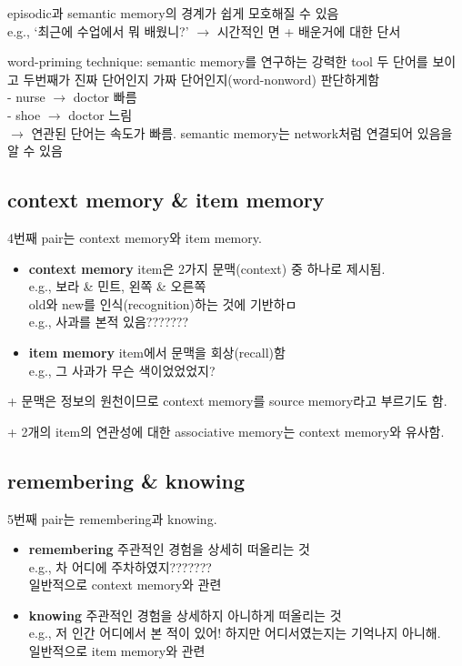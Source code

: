 \documentclass[../note.tex]{subfiles}
\begin{document}
\begin{note}
\begin{itemize}
      episodic과 semantic memory의 경계가 쉽게 모호해질 수 있음\\
      e.g., `최근에 수업에서 뭐 배웠니?' $\rightarrow$ 시간적인 면 + 배운거에 대한 단서

      word-priming technique: semantic memory를 연구하는 강력한 tool
        두 단어를 보이고 두번째가 진짜 단어인지 가짜 단어인지(word-nonword) 판단하게함\\
        - nurse $\rightarrow$ doctor 빠름\\
        - shoe $\rightarrow$ doctor 느림\\
        $\rightarrow$ 연관된 단어는 속도가 빠름. semantic memory는 network처럼 연결되어 있음을 알 수 있음
  \end{itemize}
\end{note}

\subsection{context memory \& item memory}
\label{subsec:contextmemoryitemmemory}
4번째 pair는 context memory와 item memory.

\begin{itemize}
  \item{\textbf{context memory}}
    item은 2가지 문맥(context) 중 하나로 제시됨.\\
    e.g., 보라 \& 민트, 왼쪽 \& 오른쪽\\
    old와 new를 인식(recognition)하는 것에 기반하ㅁ\\
    e.g., 사과를 본적 있음???????
  \item{\textbf{item memory}}
    item에서 문맥을 회상(recall)함\\
    e.g., 그 사과가 무슨 색이었었었지?
\end{itemize}

+ 문맥은 정보의 원천이므로 context memory를 source memory라고 부르기도 함.

+ 2개의 item의 연관성에 대한 associative memory는 context memory와 유사함.

\subsection{remembering \& knowing}
5번째 pair는 remembering과 knowing.

\begin{itemize}
  \item{\textbf{remembering}}
    주관적인 경험을 상세히 떠올리는 것\\
    e.g., 차 어디에 주차하였지???????\\
    일반적으로 context memory와 관련
  \item{\textbf{knowing}}
    주관적인 경험을 상세하지 아니하게 떠올리는 것\\
    e.g., 저 인간 어디에서 본 적이 있어! 하지만 어디서였는지는 기억나지 아니해.\\
    일반적으로 item memory와 관련
\end{itemize}
\end{document}
